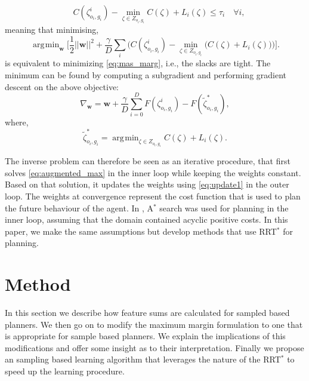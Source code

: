 \documentclass{article}  %
\DeclareMathOperator*{\argmin}{\arg\!\min}
\begin{document}
\begin{equation}
	 \quad C(\zeta^i_{o_i,g_i}) - \min_{\zeta \in Z_{o_i,g_i}} C(\zeta) + L_i(\zeta)  \leq \tau_i  \quad \forall i,
\end{equation}
meaning that minimising,
\begin{equation}
	\argmin_{\mathbf{w}} \big[ \frac{1}{2}||\mathbf{w}||^2 + \frac{\gamma}{D} \sum_i \big( C(\zeta^i_{o_i,g_i}) - \min_{\zeta \in Z_{o_i,g_i}}\big(C(\zeta) + L_i(\zeta)\big) \big) \big]. \label{eq:unconstrained}
\end{equation}
is equivalent to minimizing \eqref{eq:mas_marg}, i.e., the slacks are tight.
The minimum can be found by computing a subgradient and performing gradient descent on the above objective:
\begin{equation}
	\nabla_{\mathbf{w}} =\mathbf{w} +  \frac{\gamma}{D} \sum_{i=0}^D F(\zeta^i_{o_i,g_i}) - F(\tilde{\zeta}^*_{o_i,g_i}), \label{eq:update1}
\end{equation}
where,
\begin{equation}
	\tilde{\zeta}^*_{o_i,g_i} = \argmin_{\zeta \in Z_{o_i,g_i}} C(\zeta) + L_i(\zeta). \label{eq:augmented_max}
\end{equation}

The inverse problem can therefore be seen as an iterative procedure, that first solves \eqref{eq:augmented_max} in the inner loop while keeping the weights constant. Based on that solution, it updates the weights using \eqref{eq:update1} in the outer loop. The weights at convergence represent the cost function that is used to plan the future behaviour of the agent. In \cite{ratliff2006maximum}, A$^*$ search was used for planning in the inner loop, assuming that the domain contained acyclic positive costs. In this paper, we make the same assumptions but develop methods that use RRT$^*$ for planning.

\section{Method}
	In this section we describe how feature sums are calculated for sampled based planners. We then go on to modify the maximum margin formulation to one that is appropriate for sample based planners. We explain the implications of this modifications and offer some insight as to their interpretation. Finally we propose an sampling based learning algorithm that leverages the nature of the RRT$^*$ to speed up the learning procedure.
\end{document}
